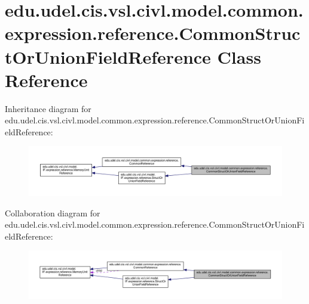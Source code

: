 \hypertarget{classedu_1_1udel_1_1cis_1_1vsl_1_1civl_1_1model_1_1common_1_1expression_1_1reference_1_1CommonStructOrUnionFieldReference}{}\section{edu.\+udel.\+cis.\+vsl.\+civl.\+model.\+common.\+expression.\+reference.\+Common\+Struct\+Or\+Union\+Field\+Reference Class Reference}
\label{classedu_1_1udel_1_1cis_1_1vsl_1_1civl_1_1model_1_1common_1_1expression_1_1reference_1_1CommonStructOrUnionFieldReference}


Inheritance diagram for edu.\+udel.\+cis.\+vsl.\+civl.\+model.\+common.\+expression.\+reference.\+Common\+Struct\+Or\+Union\+Field\+Reference\+:
\nopagebreak
\begin{figure}[H]
\begin{center}
\leavevmode
\includegraphics[width=350pt]{classedu_1_1udel_1_1cis_1_1vsl_1_1civl_1_1model_1_1common_1_1expression_1_1reference_1_1CommonSt757d010edcc4618a7c4a973eb3c3df95}
\end{center}
\end{figure}


Collaboration diagram for edu.\+udel.\+cis.\+vsl.\+civl.\+model.\+common.\+expression.\+reference.\+Common\+Struct\+Or\+Union\+Field\+Reference\+:
\nopagebreak
\begin{figure}[H]
\begin{center}
\leavevmode
\includegraphics[width=350pt]{classedu_1_1udel_1_1cis_1_1vsl_1_1civl_1_1model_1_1common_1_1expression_1_1reference_1_1CommonSte4531c937d4f57697f56493424bc8639}
\end{center}
\end{figure}
